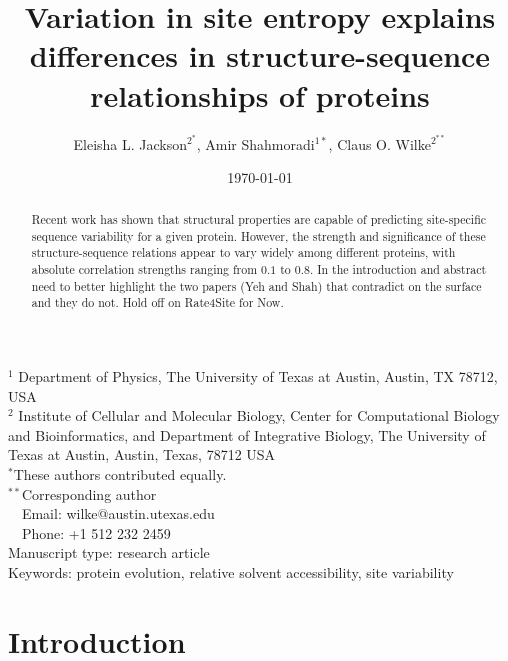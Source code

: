 \documentclass[12pt]{article}
\title{Variation in site entropy explains differences in structure-sequence relationships of proteins}
\author{Eleisha L. Jackson$^{2^*}$, Amir Shahmoradi$^{1*}$, Claus O. Wilke$^{2^{**}}$}
\begin{document}
\date{\today}
\maketitle


\noindent
$^1$ Department of Physics, The University of Texas at Austin, Austin, TX 78712, USA \\
$^2$ Institute of Cellular and Molecular Biology, Center for Computational Biology and Bioinformatics, and Department of Integrative Biology, The University of Texas at Austin, Austin, Texas, 78712 USA\\

\noindent $^{*}$These authors contributed equally. \\

\bigskip
\noindent
$^{**}$Corresponding author\\
$\phantom{^{** }}$Email: wilke@austin.utexas.edu\\
$\phantom{^{**}}$Phone: +1 512 232 2459\\

\bigskip
\noindent
Manuscript type: research article\\
\bigskip
\noindent  Keywords: protein evolution, relative solvent accessibility, site variability


\begin{abstract}
{\color{red}Recent work has shown that structural properties are capable of predicting site-specific sequence variability for a given protein. However, the strength and significance of these structure-sequence relations appear to vary widely among different proteins, with absolute correlation strengths ranging from $0.1$ to $0.8$.  In the introduction and abstract need to better highlight the two papers (Yeh and Shah) that contradict on the surface and they do not. Hold off on Rate4Site for Now.}
\end{abstract}
\vfill
\vfill
\def\thefootnote{\fnsymbol{footnote}}
\setcounter{footnote}{0}


\section{Introduction}
\label{sec:intro}
\end{document}
